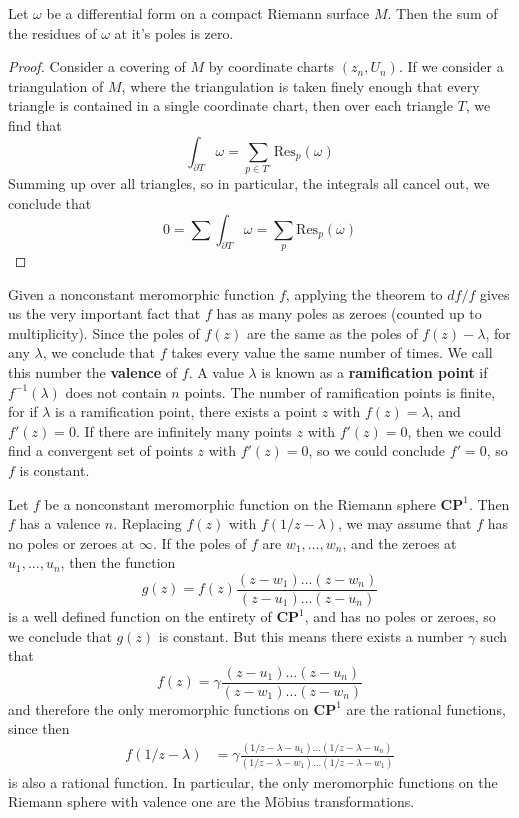 \begin{theorem}
    Let $\omega$ be a differential form on a compact Riemann surface $M$. Then the sum of the residues of $\omega$ at it's poles is zero.
\end{theorem}
\begin{proof}
    Consider a covering of $M$ by coordinate charts $(z_n, U_n)$. If we consider a triangulation of $M$, where the triangulation is taken finely enough that every triangle is contained in a single coordinate chart, then over each triangle $T$, we find that
    \[ \int_{\partial T} \omega = \sum_{p \in T^\circ} \text{Res}_p(\omega) \]
    Summing up over all triangles, so in particular, the integrals all cancel out, we conclude that
    \[ 0 = \sum \int_{\partial T} \omega = \sum_p \text{Res}_p(\omega) \]
\end{proof}

Given a nonconstant meromorphic function $f$, applying the theorem to $df/f$ gives us the very important fact that $f$ has as many poles as zeroes (counted up to multiplicity). Since the poles of $f(z)$ are the same as the poles of $f(z) - \lambda$, for any $\lambda$, we conclude that $f$ takes every value the same number of times. We call this number the {\bf valence} of $f$. A value $\lambda$ is known as a {\bf ramification point} if $f^{-1}(\lambda)$ does not contain $n$ points. The number of ramification points is finite, for if $\lambda$ is a ramification point, there exists a point $z$ with $f(z) = \lambda$, and $f'(z) = 0$. If there are infinitely many points $z$ with $f'(z) = 0$, then we could find a convergent set of points $z$ with $f'(z) = 0$, so we could conclude $f' = 0$, so $f$ is constant.

\begin{example}
    Let $f$ be a nonconstant meromorphic function on the Riemann sphere $\mathbf{CP}^1$. Then $f$ has a valence $n$. Replacing $f(z)$ with $f(1/z - \lambda)$, we may assume that $f$ has no poles or zeroes at $\infty$. If the poles of $f$ are $w_1, \dots, w_n$, and the zeroes at $u_1, \dots, u_n$, then the function
    \[ g(z) = f(z) \frac{(z - w_1) \dots (z - w_n)}{(z - u_1) \dots (z - u_n)} \]
    is a well defined function on the entirety of $\mathbf{CP}^1$, and has no poles or zeroes, so we conclude that $g(z)$ is constant. But this means there exists a number $\gamma$ such that
    \[ f(z) = \gamma \frac{(z - u_1) \dots (z - u_n)}{(z - w_1) \dots (z - w_n)} \]
    and therefore the only meromorphic functions on $\mathbf{CP}^1$ are the rational functions, since then
    \begin{align*}
        f(1/z - \lambda) &= \gamma \frac{(1/z - \lambda - u_1) \dots (1/z - \lambda - u_n)}{(1/z - \lambda - w_1) \dots (1/z - \lambda - w_1)}
    \end{align*}
    is also a rational function. In particular, the only meromorphic functions on the Riemann sphere with valence one are the M\"{o}bius transformations.
\end{example}

